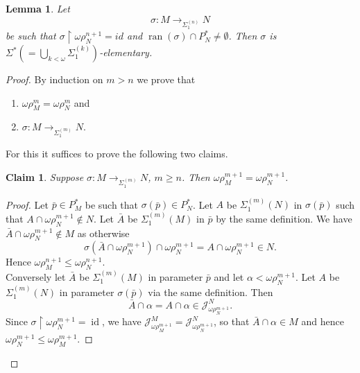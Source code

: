 \documentclass[12pt,a4paper]{article}
\theoremstyle{nicestyle}
\newtheorem{lemma}{Lemma}[subsection]
\newtheorem{claim}{Claim}[subsection]
\newenvironment{proofblack}{\begin{proof}}
  {\renewcommand{\qedsymbol}{$\blacksquare$}\end{proof}}
\DeclareMathOperator{\ran}{ran}
\DeclareMathOperator{\id}{id}
\begin{document}
    \begin{lemma}
      Let
      \[
	\sigma \colon M \to_{\Sigma^{(n)}_{1}} N
      \]
      be such that $\sigma \restriction \omega\rho^{n+1}_{N} = id$ and
      $\ran(\sigma) \cap P^{*}_{N} \neq \emptyset$. Then $\sigma$ is
      $\Sigma^{*} (= \bigcup_{k <
        \omega}\Sigma^{(k)}_{1})$-elementary.
    \end{lemma}

    \begin{proof}
      By induction on $m > n$ we prove that
      \begin{enumerate}
      \item $\omega\rho^{m}_{M} = \omega\rho^{m}_{N}$ and
      \item $\sigma \colon M \to _{\Sigma^{(m)}_{1}} N$.
      \end{enumerate}
      For this it suffices to prove the following two claims.
      \begin{claim}
        Suppose $\sigma \colon M \to_{\Sigma^{(m)}_{1}} N$, $m \ge
        n$. Then $\omega\rho^{m+1}_{M} = \omega\rho^{m+1}_{N}$.
      \end{claim}

      \begin{proofblack}
        Let $\bar{p} \in P^{*}_{M}$ be such that
        $\sigma(\bar{p}) \in P^{*}_{N}$. Let $A$ be
        $\Sigma^{(m)}_{1}(N)$ in $\sigma(\bar{p})$ such that
        $A \cap \omega\rho^{m+1}_{N} \not \in N$. Let $\bar{A}$ be
        $\Sigma^{(m)}_{1}(M)$ in $\bar{p}$ by the same
        definition. We have $\bar{A} \cap \omega\rho^{m+1}_{N} \not \in M$ as otherwise
        \[
          \sigma(\bar{A} \cap \omega\rho^{m+1}_{N}) \cap
          \omega\rho^{m+1}_{N} = A \cap \omega\rho^{m+1}_{N} \in N.
        \]
        Hence $\omega\rho^{n+1}_{M} \le \omega\rho^{n+1}_{N}$. \\
        Conversely let $\bar{A}$ be $\Sigma^{(m)}_{1}(M)$ in parameter
        $\bar{p}$ and let $\alpha < \omega\rho^{m+1}_{N}$. Let $A$ be
        $\Sigma^{(m)}_{1}(N)$ in parameter $\sigma(\bar{p})$ via the
        same definition. Then
        \[
          \bar{A} \cap \alpha = A \cap \alpha \in \mathcal{J}^{N}_{\omega\rho^{m+1}_{N}}.
        \]
        Since $\sigma \restriction \omega\rho^{m+1}_{N} = \id$, we
        have
        $\mathcal{J}^{M}_{\omega\rho^{m+1}_{M}} =
        \mathcal{J}^{N}_{\omega\rho^{m+1}_{N}}$, so that
        $\bar{A} \cap \alpha \in M$ and hence
        $\omega\rho^{m+1}_{N} \le \omega\rho^{m+1}_{M}$.
      \end{proofblack}


\end{proof}
\end{document}
